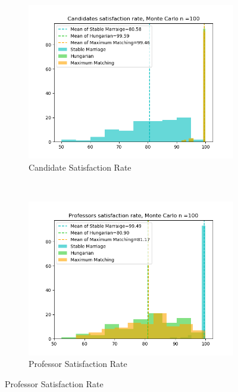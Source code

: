 \documentclass[twoside,twocolumn]{article}
\begin{document}
    \begin{figure}[t]
        \centering
        \begin{subfigure}{0.32\textwidth}
            \centering
            \includegraphics[width=\textwidth]{../figures/50candidates_5courses_100simulations/can_rate.png}
            \caption{Candidate Satisfaction Rate}
        \end{subfigure}%
        ~
        \begin{subfigure}{0.32\textwidth}
            \centering
            \includegraphics[width=\textwidth]{../figures/50candidates_5courses_100simulations/prof_rate.png}
            \caption{Professor Satisfaction Rate}
        \end{subfigure}

\end{figure}
\end{document}
